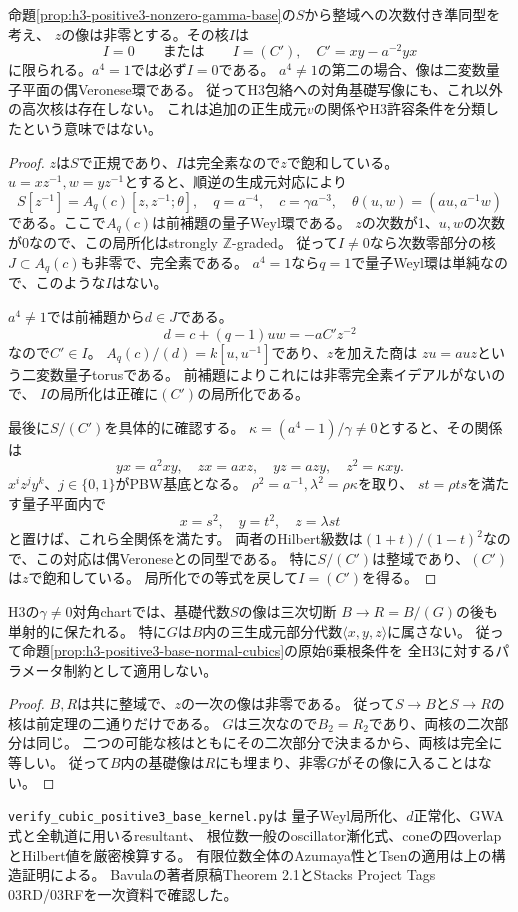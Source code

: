 \begin{theorem}\label{thm:h3-positive3-base-kernel-dichotomy}
命題\ref{prop:h3-positive3-nonzero-gamma-base}の$S$から整域への次数付き準同型を考え、
$z$の像は非零とする。その核$I$は
\[
 I=0\qquad\text{または}\qquad I=(C'),\quad C'=xy-a^{-2}yx
\]
に限られる。$a^4=1$では必ず$I=0$である。
$a^4\ne1$の第二の場合、像は二変数量子平面の偶Veronese環である。
従ってH3包絡への対角基礎写像にも、これ以外の高次核は存在しない。
これは追加の正生成元$v$の関係やH3許容条件を分類したという意味ではない。
\end{theorem}
\begin{proof}
$z$は$S$で正規であり、$I$は完全素なので$z$で飽和している。
$u=xz^{-1},w=yz^{-1}$とすると、順逆の生成元対応により
\[
 S[z^{-1}]=A_q(c)[z,z^{-1};\theta],\quad
 q=a^{-4},\quad c=\gamma a^{-3},\quad
 \theta(u,w)=(au,a^{-1}w)
\]
である。ここで$A_q(c)$は前補題の量子Weyl環である。
$z$の次数が1、$u,w$の次数が0なので、この局所化はstrongly $\mathbb Z$-graded。
従って$I\ne0$なら次数零部分の核$J\subset A_q(c)$も非零で、完全素である。
$a^4=1$なら$q=1$で量子Weyl環は単純なので、このような$I$はない。

$a^4\ne1$では前補題から$d\in J$である。
\[
 d=c+(q-1)uw=-aC'z^{-2}
\]
なので$C'\in I$。
$A_q(c)/(d)=k[u,u^{-1}]$であり、$z$を加えた商は
$zu=auz$という二変数量子torusである。
前補題によりこれには非零完全素イデアルがないので、
$I$の局所化は正確に$(C')$の局所化である。

最後に$S/(C')$を具体的に確認する。
$\kappa=(a^4-1)/\gamma\ne0$とすると、その関係は
\[
 yx=a^2xy,\quad zx=axz,\quad yz=azy,\quad z^2=\kappa xy.
\]
$x^iz^jy^k$、$j\in\{0,1\}$がPBW基底となる。
$\rho^2=a^{-1},\lambda^2=\rho\kappa$を取り、
$st=\rho ts$を満たす量子平面内で
\[
 x=s^2,\quad y=t^2,\quad z=\lambda st
\]
と置けば、これら全関係を満たす。
両者のHilbert級数は$(1+t)/(1-t)^2$なので、この対応は偶Veroneseとの同型である。
特に$S/(C')$は整域であり、$(C')$は$z$で飽和している。
局所化での等式を戻して$I=(C')$を得る。
\end{proof}

\begin{corollary}\label{cor:h3-positive3-base-survives-cut}
H3の$\gamma\ne0$対角chartでは、基礎代数$S$の像は三次切断
$B\to R=B/(G)$の後も単射的に保たれる。
特に$G$は$B$内の三生成元部分代数$\langle x,y,z\rangle$に属さない。
従って命題\ref{prop:h3-positive3-base-normal-cubics}の原始6乗根条件を
全H3に対するパラメータ制約として適用しない。
\end{corollary}
\begin{proof}
$B,R$は共に整域で、$z$の一次の像は非零である。
従って$S\to B$と$S\to R$の核は前定理の二通りだけである。
$G$は三次なので$B_2=R_2$であり、両核の二次部分は同じ。
二つの可能な核はともにその二次部分で決まるから、両核は完全に等しい。
従って$B$内の基礎像は$R$にも埋まり、非零$G$がその像に入ることはない。
\end{proof}

\texttt{verify\_cubic\_positive3\_base\_kernel.py}は
量子Weyl局所化、$d$正常化、GWA式と全軌道に用いるresultant、
根位数一般のoscillator漸化式、coneの四overlapとHilbert値を厳密検算する。
有限位数全体のAzumaya性とTsenの適用は上の構造証明による。
Bavulaの著者原稿Theorem 2.1とStacks Project Tags 03RD/03RFを一次資料で確認した。
